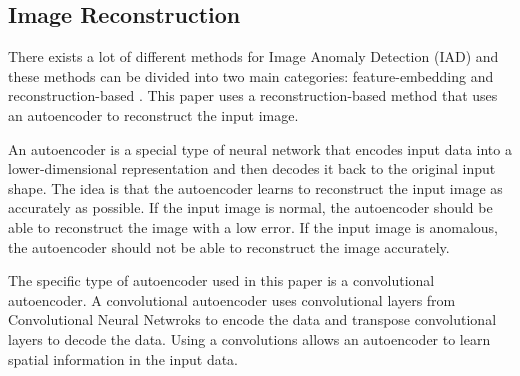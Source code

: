 \subsection{Image Reconstruction}

There exists a lot of different methods for Image Anomaly Detection (IAD) and these methods can be divided into two main categories: feature-embedding and reconstruction-based \cite{Liu_2024}. This paper uses a reconstruction-based method that uses an autoencoder to reconstruct the input image. 
\par
An autoencoder is a special type of neural network that encodes input data into a lower-dimensional representation and then decodes it back to the original input shape. The idea is that the autoencoder learns to reconstruct the input image as accurately as possible. If the input image is normal, the autoencoder should be able to reconstruct the image with a low error. If the input image is anomalous, the autoencoder should not be able to reconstruct the image accurately.
\par
The specific type of autoencoder used in this paper is a convolutional autoencoder. A convolutional autoencoder uses convolutional layers from Convolutional Neural Netwroks to encode the data and transpose convolutional layers to decode the data. Using a convolutions allows an autoencoder to learn spatial information in the input data. 